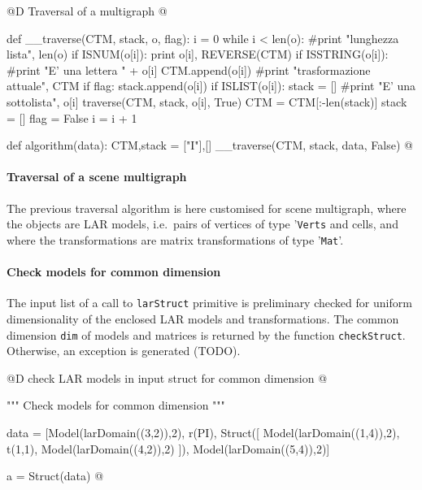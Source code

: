 \documentclass[11pt,oneside]{article}	%
\begin{document}
@D Traversal of a multigraph
@{def __traverse(CTM, stack, o, flag):
    i = 0
    while i < len(o):
        #print "lunghezza lista", len(o)
        if ISNUM(o[i]): print o[i], REVERSE(CTM)
        if ISSTRING(o[i]): 
            #print "E' una lettera " + o[i]
            CTM.append(o[i])
            #print "trasformazione attuale", CTM
            if flag: stack.append(o[i])
        if ISLIST(o[i]):
            stack = [] 
            #print "E' una sottolista", o[i]
            traverse(CTM, stack, o[i], True)
            CTM = CTM[:-len(stack)]
            stack = []
            flag = False
        i = i + 1

def algorithm(data):
    CTM,stack = ["I"],[]
    __traverse(CTM, stack, data, False)  
@}

\paragraph{Traversal of a scene multigraph}

The previous traversal algorithm is here customised for scene multigraph, where the objects are LAR models, i.e.~pairs of vertices of type '\texttt{Verts} and cells, and where the transformations are matrix transformations of type '\texttt{Mat}'.

\paragraph{Check models for common dimension}
The input list of a call to \texttt{larStruct} primitive is preliminary checked for uniform dimensionality of the enclosed LAR models and transformations. The common dimension \texttt{dim} of models and matrices is returned by the function \texttt{checkStruct}. Otherwise, an exception is generated (TODO).

@D check LAR models in input struct for common dimension
@{""" Check models for common dimension """


data = [Model(larDomain((3,2)),2), 
		r(PI), 
		Struct([ Model(larDomain((1,4)),2), 
		  t(1,1), 
		  Model(larDomain((4,2)),2) ]), 
		Model(larDomain((5,4)),2)] 
		
a = Struct(data)
@}
\end{document}
